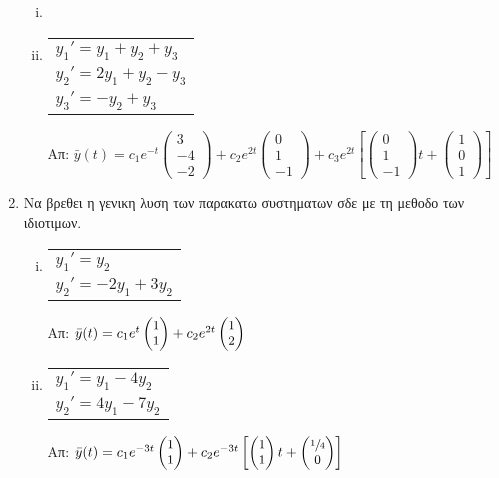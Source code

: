 \begin{enumerate}
\begin{enumerate}[i)]
\item \item  \begin{tabular}{l} $y_1'=y_1+y_2+y_3$ \\ $y_2'=2y_1+y_2-y_3$ \\ $y_3'=-y_2+y_3$\end{tabular}\hfill Απ: $\scriptstyle{\bar{y}(t)=c_1e^{-t}\begin{pmatrix}
3\\-4\\-2
\end{pmatrix}+c_2e^{2t}\begin{pmatrix}
0\\1\\-1
\end{pmatrix}+c_3e^{2t}\left[\begin{pmatrix}
0\\1\\-1
\end{pmatrix}t+\begin{pmatrix}
1\\0\\1
\end{pmatrix}\right]}$
\end{enumerate}


\item Να βρεθει η γενικη λυση των παρακατω συστηματων σδε με τη μεθοδο των ιδιοτιμων.
\begin{enumerate}[i)]

\item \begin{tabular}{l} $y_1'=y_2$ \\ $y_2'=-2y_1+3y_2$\end{tabular} \hfill Απ: $\small{\bar{y}(t)=c_1e^{t}\begin{pmatrix}
1\\1
\end{pmatrix}+c_2e^{2t}\begin{pmatrix}
1\\2
\end{pmatrix}}$

\item \begin{tabular}{l} $y_1'=y_1-4y_2$ \\ $y_2'=4y_1-7y_2$\end{tabular} \hfill Απ: $\small{\bar{y}(t)=c_1e^{-3t}\begin{pmatrix}
1\\1
\end{pmatrix}+c_2e^{-3t}\left[\begin{pmatrix}
1\\1
\end{pmatrix}t+\begin{pmatrix}
\sfrac{1}{4}\\0
\end{pmatrix}\right]}$


\end{enumerate}
\end{enumerate}
